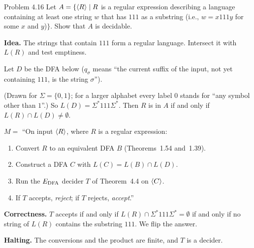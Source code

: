 \begin{question}{Problem 4.16}
Let $A=\{\langle R\rangle\mid R$ is a regular expression describing a language containing at least one string $w$ that has $111$ as a substring (i.e., $w=x111y$ for some $x$ and $y$)$\}$. Show that $A$ is decidable.
\end{question}
\begin{soln}
\textbf{Idea.} The strings that contain $111$ form a regular language. Intersect it with $L(R)$ and test emptiness.

Let $D$ be the DFA below ($q_{\sigma}$ means ``the current suffix of the input, not yet containing $111$, is the string $\sigma$'').

\begin{center}
\end{center}
(Drawn for $\Sigma=\{0,1\}$; for a larger alphabet every label $0$ stands for ``any symbol other than $1$''.) So $L(D)=\Sigma^*111\Sigma^*$. Then $R$ is in $A$ if and only if $L(R)\cap L(D)\ne\emptyset$.

$M=$ ``On input $\langle R\rangle$, where $R$ is a regular expression:
\begin{enumerate}
\item Convert $R$ to an equivalent DFA $B$ (Theorems~1.54 and~1.39).
\item Construct a DFA $C$ with $L(C)=L(B)\cap L(D)$.
\item Run the $E_{\mathrm{DFA}}$ decider $T$ of Theorem~4.4 on $\langle C\rangle$.
\item If $T$ accepts, \emph{reject}; if $T$ rejects, \emph{accept}.''
\end{enumerate}

\textbf{Correctness.} $T$ accepts if and only if $L(R)\cap\Sigma^*111\Sigma^*=\emptyset$ if and only if no string of $L(R)$ contains the substring $111$. We flip the answer.

\textbf{Halting.} The conversions and the product are finite, and $T$ is a decider.
\end{soln}
